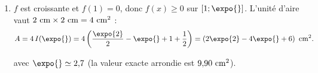 \begin{description}
\begin{enumerate}
\begin{enumerate}
						Une primitive de $f$ sur $]0;+\infty[$ est $F(x) = \frac{x^2}{2} - x + 2h(x) = \frac{x^2}{2} - x + (\ln x)^2$. Donc
						\[
							I(\alpha) = F(\alpha) - F(1) = \frac{\alpha^2}{2} - \alpha + (\ln\alpha)^2 - \left(\frac{1}{2} - 1\right).
						\]

					\item {}
						$f$ est croissante et $f(1) = 0$, donc $f(x) \geq 0$ sur $[1;\expo{}]$. L'unité d'aire vaut $2~\mathrm{cm}\times2~\mathrm{cm} = 4~\mathrm{cm}^2$ :
						\[
							A = 4\,I(\expo{}) = 4\left(\frac{\expo{2}}{2} - \expo{} + 1 + \frac{1}{2}\right) = \left(2\expo{2} - 4\expo{} + 6\right)\cm^2.
						\]

						 avec $\expo{} \simeq 2{,}7$
						(la valeur exacte arrondie est $9{,}90~\mathrm{cm}^2$).
				\end{enumerate}
			\end{enumerate}
	\end{description}
